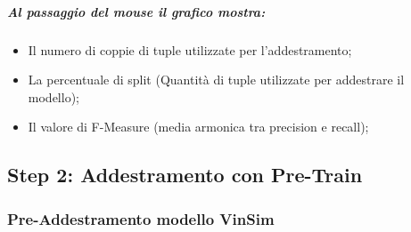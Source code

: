 \documentclass[11pt]{article}
\providecommand{\tightlist}{%
      \setlength{\itemsep}{0pt}\setlength{\parskip}{0pt}}
\begin{document}
    
    
    
    
    \subparagraph{Al passaggio del mouse il grafico
mostra:}\label{al-passaggio-del-mouse-il-grafico-mostra}

\begin{itemize}
\tightlist
\item
  Il numero di coppie di tuple utilizzate per l'addestramento;
\item
  La percentuale di split (Quantità di tuple utilizzate per addestrare
  il modello);
\item
  Il valore di F-Measure (media armonica tra precision e recall);
\end{itemize}

    \subsection{Step 2: Addestramento con
Pre-Train}\label{step-2-addestramento-con-pre-train}

    \subsubsection{Pre-Addestramento modello
VinSim}\label{pre-addestramento-modello-vinsim}
\end{document}
